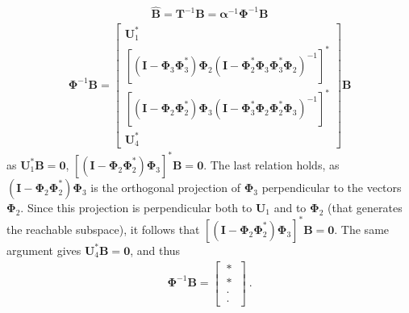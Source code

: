\documentclass[letterpaper,10pt,english]{jupyterBook}
\begin{document}
\sphinxAtStartPar
{}
\begin{equation*}
\begin{split}\hat{\mathbf{B}} =  \mathbf{T}^{-1} \mathbf{B} = \boldsymbol\alpha^{-1} \boldsymbol\Phi^{-1} \mathbf{B}\end{split}
\end{equation*}\begin{equation*}
\begin{split}
\boldsymbol\Phi^{-1} \mathbf{B} = 
\begin{bmatrix}
  \mathbf{U}_1^* \\
  \left[ \left( \mathbf{I} - \boldsymbol\Phi_3 \boldsymbol\Phi_3^* \right) \boldsymbol\Phi_2 \left( \mathbf{I} - \boldsymbol\Phi_2^* \boldsymbol\Phi_3 \boldsymbol\Phi_3^* \boldsymbol\Phi_2 \right)^{-1} \right]^* \\
  \left[ \left( \mathbf{I} - \boldsymbol\Phi_2 \boldsymbol\Phi_2^* \right) \boldsymbol\Phi_3 \left( \mathbf{I} - \boldsymbol\Phi_3^* \boldsymbol\Phi_2 \boldsymbol\Phi_2^* \boldsymbol\Phi_3 \right)^{-1} \right]^* \\
  \mathbf{U}_4^* 
\end{bmatrix} \mathbf{B}
\end{split}
\end{equation*}
\sphinxAtStartPar
as \(\mathbf{U}_1^* \mathbf{B} = \mathbf{0}\), \(\left[ \left( \mathbf{I} - \boldsymbol\Phi_2 \boldsymbol\Phi_2^* \right) \boldsymbol\Phi_3 \right]^* \mathbf{B}  = \mathbf{0}\). The last relation holds, as \(\left( \mathbf{I} - \boldsymbol\Phi_2 \boldsymbol\Phi_2^* \right) \boldsymbol\Phi_3\) is the orthogonal projection of \(\boldsymbol\Phi_3\) perpendicular to the vectors \(\boldsymbol\Phi_2\). Since this projection is perpendicular both to \(\mathbf{U}_1\) and to \(\boldsymbol\Phi_2\) (that generates the reachable sub\sphinxhyphen{}space), it follows that \(\left[ \left( \mathbf{I} - \boldsymbol\Phi_2 \boldsymbol\Phi_2^* \right) \boldsymbol\Phi_3 \right]^* \mathbf{B} = \mathbf{0}\). The same argument gives \(\mathbf{U}_4^* \mathbf{B} = \mathbf{0}\), and thus
\begin{equation*}
\begin{split}\boldsymbol\Phi^{-1} \mathbf{B} = \begin{bmatrix} \ \ast \ \\ \ \ast \ \\ \ \cdot \ \\ \ \cdot \ \end{bmatrix} \ .\end{split}
\end{equation*}
\end{document}
